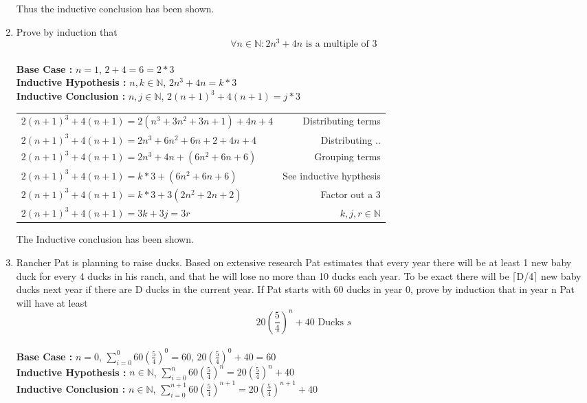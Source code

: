 \documentclass[a4paper,11pt]{article}
\begin{document}
\begin{enumerate}
Thus the inductive conclusion has been shown.



\item Prove by induction that
$$ \forall n \in \mathbb{N} : 2n^3+4n \text{ is a multiple of }3$$ \\
\textbf{ Base Case : } $n = 1$,  $ 2+4 = 6 = 2*3$ \\[.1in]
\textbf{ Inductive Hypothesis : } $n, k \in \mathbb{N}$,  $ 2n^3+4n = k*3$ \\[.1in]
\textbf{ Inductive Conclusion : } $n, j \in \mathbb{N}$,  $ 2(n+1)^3+4(n+1) = j*3$ \\[.1in]
\begin{tabular}{l | r}
$ 2(n+1)^3+4(n+1) = 2(n^3 + 3n^2 + 3n + 1) + 4n + 4$    & Distributing terms \\
$ 2(n+1)^3+4(n+1) = 2n^3 + 6n^2 + 6n + 2 + 4n + 4$      & Distributing ..  \\
$ 2(n+1)^3+4(n+1) = 2n^3 + 4n + (6n^2 + 6n + 6)$        & Grouping terms   \\
$ 2(n+1)^3+4(n+1) = k*3 + (6n^2 + 6n + 6)$              & See inductive hypthesis   \\
$ 2(n+1)^3+4(n+1) = k*3 + 3(2n^2 + 2n + 2)$             & Factor out a 3 \\
$ 2(n+1)^3+4(n+1) = 3k + 3j = 3r$                       & $k, j, r \in \mathbb{N}$   \\
\end{tabular}

The Inductive conclusion has been shown.

\item Rancher Pat is planning to raise ducks. Based on extensive research Pat estimates
that every year there will be at least 1 new baby duck for every 4 ducks in his ranch, and
that he will lose no more than 10 ducks each year. To be exact there will be $\lceil$D/4$\rceil$ new baby
ducks next year if there are D ducks in the current year. If Pat starts with 60 ducks in year
0, prove by induction that in year n Pat will have at least
$$ 20(\frac{5}{4})^n + 40 \text{ Ducks }s $$ \\
\textbf{ Base Case : } $n = 0$, $ \sum_{i=0}^{0} 60(\frac{5}{4})^0 = 60$, $20(\frac{5}{4})^0 + 40 = 60 $ \\[.1in]
\textbf{ Inductive Hypothesis : } $n \in \mathbb{N}$,  $\sum_{i=0}^{n} 60(\frac{5}{4})^n = 20(\frac{5}{4})^n + 40$ \\[.1in]
\textbf{ Inductive Conclusion : } $n \in \mathbb{N}$,  $\sum_{i=0}^{n+1} 60(\frac{5}{4})^{n+1} = 20(\frac{5}{4})^{n+1} + 40$ \\[.1in]


\end{enumerate}
\end{document}

